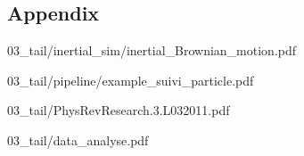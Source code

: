 \newpage
\begin{appendix}
\renewcommand{\thesection}{\Alph{section}}
\renewcommand{\appendixname}{Appendix}
\renewcommand{\thesubsection}{\thesection.\arabic{subsection}}
\renewcommand\thefigure{\thesection.\arabic{figure}}
\renewcommand\thetable{\thesection.\arabic{table}}
\setcounter{table}{0}
\setcounter{figure}{0}


\section{Appendix}


{03_tail/inertial_sim/inertial_Brownian_motion.pdf}





{03_tail/pipeline/example_suivi_particle.pdf}



{03_tail/PhysRevResearch.3.L032011.pdf}



{03_tail/data_analyse.pdf}

\end{appendix}
